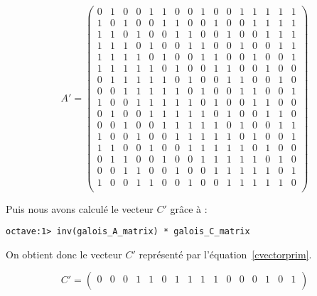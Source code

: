 \documentclass[12pt,a4paper]{report}
\begin{document}
\begin{equation}
\label{eq:amatrixprim}
A' = \left(
\begin{array}{cccccccccccccccc}
0 & 1 & 0 & 0 & 1 & 1 & 0 & 0 & 1 & 0 & 0 & 1 & 1 & 1 & 1 & 1 \\
1 & 0 & 1 & 0 & 0 & 1 & 1 & 0 & 0 & 1 & 0 & 0 & 1 & 1 & 1 & 1 \\
1 & 1 & 0 & 1 & 0 & 0 & 1 & 1 & 0 & 0 & 1 & 0 & 0 & 1 & 1 & 1 \\
1 & 1 & 1 & 0 & 1 & 0 & 0 & 1 & 1 & 0 & 0 & 1 & 0 & 0 & 1 & 1 \\
1 & 1 & 1 & 1 & 0 & 1 & 0 & 0 & 1 & 1 & 0 & 0 & 1 & 0 & 0 & 1 \\
1 & 1 & 1 & 1 & 1 & 0 & 1 & 0 & 0 & 1 & 1 & 0 & 0 & 1 & 0 & 0 \\
0 & 1 & 1 & 1 & 1 & 1 & 0 & 1 & 0 & 0 & 1 & 1 & 0 & 0 & 1 & 0 \\
0 & 0 & 1 & 1 & 1 & 1 & 1 & 0 & 1 & 0 & 0 & 1 & 1 & 0 & 0 & 1 \\
1 & 0 & 0 & 1 & 1 & 1 & 1 & 1 & 0 & 1 & 0 & 0 & 1 & 1 & 0 & 0 \\
0 & 1 & 0 & 0 & 1 & 1 & 1 & 1 & 1 & 0 & 1 & 0 & 0 & 1 & 1 & 0 \\
0 & 0 & 1 & 0 & 0 & 1 & 1 & 1 & 1 & 1 & 0 & 1 & 0 & 0 & 1 & 1 \\
1 & 0 & 0 & 1 & 0 & 0 & 1 & 1 & 1 & 1 & 1 & 0 & 1 & 0 & 0 & 1 \\
1 & 1 & 0 & 0 & 1 & 0 & 0 & 1 & 1 & 1 & 1 & 1 & 0 & 1 & 0 & 0 \\
0 & 1 & 1 & 0 & 0 & 1 & 0 & 0 & 1 & 1 & 1 & 1 & 1 & 0 & 1 & 0 \\
0 & 0 & 1 & 1 & 0 & 0 & 1 & 0 & 0 & 1 & 1 & 1 & 1 & 1 & 0 & 1 \\
1 & 0 & 0 & 1 & 1 & 0 & 0 & 1 & 0 & 0 & 1 & 1 & 1 & 1 & 1 & 0 \\
\end{array}
\right)
\end{equation}

Puis nous avons calculé le vecteur $C'$ grâce à :

\begin{verbatim}
octave:1> inv(galois_A_matrix) * galois_C_matrix
\end{verbatim}

On obtient donc le vecteur $C'$ représenté par l'équation~\ref{cvectorprim}.

\begin{equation}
\label{eq:cvectorprim}
C' = \left(
\begin{array}{cccccccccccccccc}
0 & 0 & 0 & 1 & 1 & 0 & 1 & 1 & 1 & 1 & 0 & 0 & 0 & 1 & 0 & 1 \\
\end{array}
\right)
\end{equation}
\end{document}
